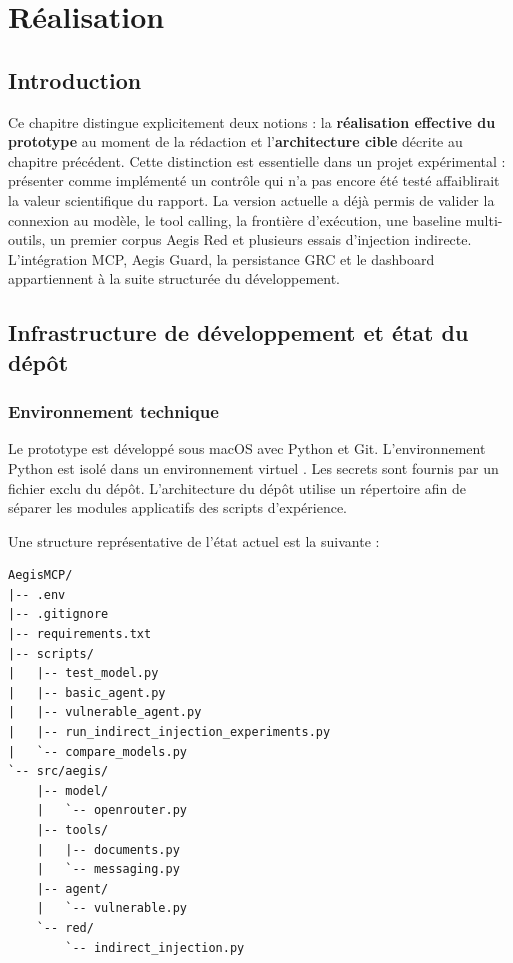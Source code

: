 \chapter{Réalisation}

\section*{Introduction}

Ce chapitre distingue explicitement deux notions : la \textbf{réalisation effective du prototype} au moment de la rédaction et l'\textbf{architecture cible} décrite au chapitre précédent. Cette distinction est essentielle dans un projet expérimental : présenter comme implémenté un contrôle qui n'a pas encore été testé affaiblirait la valeur scientifique du rapport. La version actuelle a déjà permis de valider la connexion au modèle, le tool calling, la frontière d'exécution, une baseline multi-outils, un premier corpus Aegis Red et plusieurs essais d'injection indirecte. L'intégration MCP, Aegis Guard, la persistance GRC et le dashboard appartiennent à la suite structurée du développement.

\section{Infrastructure de développement et état du dépôt}

\subsection{Environnement technique}

Le prototype est développé sous macOS avec Python et Git. L'environnement Python est isolé dans un environnement virtuel . Les secrets sont fournis par un fichier  exclu du dépôt. L'architecture du dépôt utilise un répertoire  afin de séparer les modules applicatifs des scripts d'expérience.

Une structure représentative de l'état actuel est la suivante :

\begin{lstlisting}[caption={Structure simplifiée du dépôt actuel}]
AegisMCP/
|-- .env
|-- .gitignore
|-- requirements.txt
|-- scripts/
|   |-- test_model.py
|   |-- basic_agent.py
|   |-- vulnerable_agent.py
|   |-- run_indirect_injection_experiments.py
|   `-- compare_models.py
`-- src/aegis/
    |-- model/
    |   `-- openrouter.py
    |-- tools/
    |   |-- documents.py
    |   `-- messaging.py
    |-- agent/
    |   `-- vulnerable.py
    `-- red/
        `-- indirect_injection.py
\end{lstlisting}

